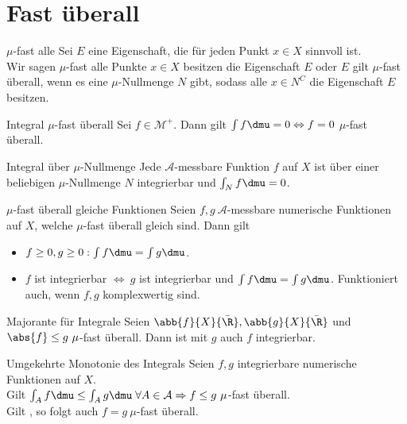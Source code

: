 \section*{Fast überall}

\begin{karte}{\(\mu\)-fast alle}
	Sei \(E\) eine Eigenschaft, die für jeden Punkt \(x\in X\) sinnvoll ist.\\
	Wir sagen \( \mu \)-fast alle Punkte \(x\in X\) besitzen die Eigenschaft \(E\) 
	oder \(E\) gilt \(\mu\)-fast überall, wenn es eine \(\mu\)-Nullmenge \(N\) gibt, 
	sodass alle \(x \in N^C\) die Eigenschaft \(E\) besitzen.
\end{karte}

\begin{karte}{Integral \(\mu\)-fast überall}
	Sei \(f \in \mathcal{M}^+\). Dann gilt \( \int f \dmu = 0 \Leftrightarrow f = 0 \) \(\mu\)-fast überall.
\end{karte}

\begin{karte}{Integral über \(\mu\)-Nullmenge}
	Jede \(\mathcal{A}\)-messbare Funktion \(f\) auf \(X\) ist 
	über einer beliebigen \( \mu \)-Nullmenge \(N\) 
	integrierbar und \( \int_N f \dmu = 0 \).
\end{karte}

\begin{karte}{\(\mu\)-fast überall gleiche Funktionen}
	Seien \( f,g\ \mathcal{A} \)-messbare numerische Funktionen 
	auf \(X\), welche \(\mu\)-fast überall gleich sind.
	Dann gilt 
	\begin{itemize}
		\item \( f \geq 0, g\geq 0 : \int f \dmu = \int g \dmu \).
		\item \(f\) ist integrierbar \( \Leftrightarrow\ g \) ist integrierbar und \( \int f \dmu = \int g \dmu \). Funktioniert auch, wenn \(f,g\) komplexwertig sind.
	\end{itemize}
\end{karte}

\begin{karte}{Majorante für Integrale}
	Seien \( \abb{f}{X}{\bar{\R}}, \abb{g}{X}{\bar{\R}} \) 
	und \(\abs{f} \leq g \ \mu\)-fast überall. 
	Dann ist mit \(g\) auch \(f\) integrierbar.
\end{karte}

\begin{karte}{Umgekehrte Monotonie des Integrals}
	Seien \( f,g \) integrierbare numerische Funktionen auf \(X\). \\
	Gilt \( \int_A f\dmu \leq \int_A g \dmu \;\forall A\in \mathcal{A} \Rightarrow f \leq g \ \mu \)-fast überall.\\
	Gilt \gqq{\(=\)}, so folgt auch \(f = g\ \mu\)-fast überall.
\end{karte}